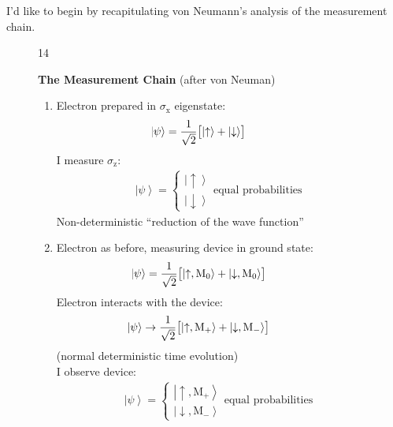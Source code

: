 \documentclass[12pt,nofootinbib]{revtex4}
\newcommand{\ket}[1]{\left|#1\right\rangle}
\newcommand{\x}{\text{x}}
\newcommand{\z}{\text{z}}
\newcommand{\M}{\text{M}}
\newcommand{\up}{\uparrow}
\newcommand{\dw}{\downarrow}
\begin{document}
I'd like to begin by recapitulating von Neumann's analysis of the measurement chain.

\begin{figure}[htb] 
\begin{mdframed}
  \vspace{5pt}\hfill 14\\[-18pt]
  \begin{center}
    \textbf{The Measurement Chain} (after von Neuman)
  \end{center}
  \begin{raggedright}
  \begin{enumerate}[label={(\arabic*)}]\setcounter{enumi}{0}
    \item Electron prepared in $\sigma_\x$ eigenstate:
      \begin{align}\nonumber
        &\hspace{-20pt}
          \ket{\psi}=\frac{1}{\sqrt{2}}
          \bigl[\ket{\up} + \ket{\dw}\bigr]
      \end{align}
      I measure $\sigma_\z$:
      \begin{align}\nonumber
        &%
          \ket{\psi}=
          \begin{cases}
            \ket{\up} \\[3pt] \ket{\dw}
          \end{cases}
        \text{equal probabilities}
      \end{align}
      Non-deterministic ``reduction of the wave function''
    \item Electron as before, measuring device in ground state:
      \begin{align}\nonumber
        &\hspace{-20pt}
          \ket{\psi}=\frac{1}{\sqrt{2}}
          \bigl[\ket{\up,\M_0} + \ket{\dw,\M_0}\bigr]
      \end{align}
      Electron interacts with the device:
      \begin{align}\nonumber
        &\hspace{-20pt}
          \ket{\psi}\rightarrow\frac{1}{\sqrt{2}}
          \bigl[\ket{\up,\M_+} + \ket{\dw,\M_-}\bigr]
      \end{align}
      (normal deterministic time evolution)\\[5pt]
      I observe device:
      \begin{align}\nonumber
        &%
          \ket{\psi}=
          \begin{cases}
            \ket{\up,\M_+} \\[3pt] \ket{\dw,\M_-}
          \end{cases}
        \text{equal probabilities}
      \end{align}
  \end{enumerate}
  \end{raggedright}
\vspace{-.5\baselineskip}
\end{mdframed}
\end{figure}
\end{document}
